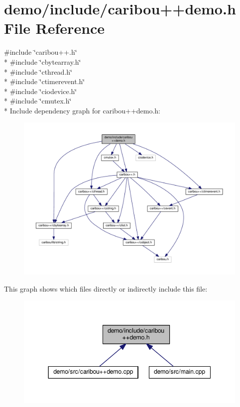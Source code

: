\section{demo/include/caribou++demo.h File Reference}
\label{caribou_09_09demo_8h}
{\ttfamily \#include \char`\"{}caribou++.\+h\char`\"{}}\\*
{\ttfamily \#include \char`\"{}cbytearray.\+h\char`\"{}}\\*
{\ttfamily \#include \char`\"{}cthread.\+h\char`\"{}}\\*
{\ttfamily \#include \char`\"{}ctimerevent.\+h\char`\"{}}\\*
{\ttfamily \#include \char`\"{}ciodevice.\+h\char`\"{}}\\*
{\ttfamily \#include \char`\"{}cmutex.\+h\char`\"{}}\\*
Include dependency graph for caribou++demo.h\+:
\nopagebreak
\begin{figure}[H]
\begin{center}
\leavevmode
\includegraphics[width=350pt]{caribou_09_09demo_8h__incl}
\end{center}
\end{figure}
This graph shows which files directly or indirectly include this file\+:
\nopagebreak
\begin{figure}[H]
\begin{center}
\leavevmode
\includegraphics[width=344pt]{caribou_09_09demo_8h__dep__incl}
\end{center}
\end{figure}
